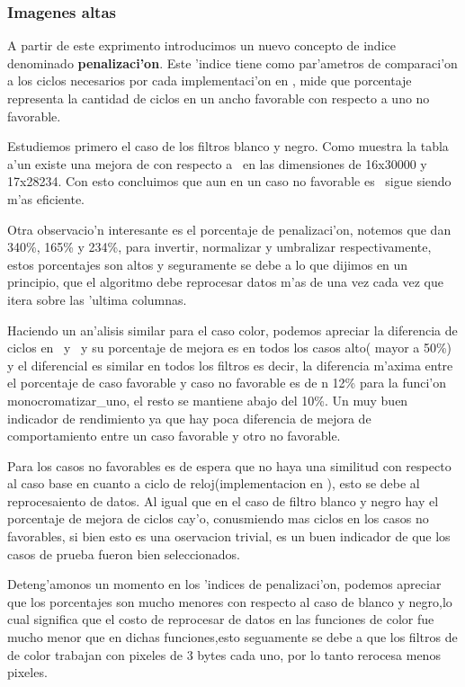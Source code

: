 \subsubsection{Imagenes altas}
A partir de este exprimento introducimos un nuevo concepto de indice denominado
\textbf{penalizaci'on}. Este 'indice tiene como par'ametros de comparaci'on a los ciclos necesarios por
cada implementaci'on en \ass, mide que porcentaje representa la cantidad de ciclos en un ancho 
favorable con respecto a uno no favorable.

Estudiemos primero el caso de los filtros blanco y negro. Como muestra la tabla a'un existe una 
mejora de \ass  con respecto a \C \  en las dimensiones de 16x30000 y 17x28234. Con esto concluimos que aun
en un caso no favorable es \ass \ sigue siendo m'as eficiente.

Otra observacio'n interesante es el porcentaje de penalizaci'on, notemos que dan 340\%, 165\% y
234\%, para invertir, normalizar y umbralizar respectivamente, estos porcentajes son altos 
y seguramente se debe a lo que dijimos en un principio, que el algoritmo debe reprocesar datos m'as de 
una vez cada vez que itera sobre las 'ultima columnas.

Haciendo un an'alisis similar para el caso color, 
podemos apreciar la diferencia de ciclos en \C \ y \ass \ y su porcentaje de mejora es en todos los casos
alto( mayor a 50\%) y el diferencial es similar en todos los filtros es decir,
la diferencia m'axima entre el porcentaje de caso favorable y caso no favorable es de n 12\% para la funci'on monocromatizar_uno,
el resto se mantiene abajo del 10\%. Un muy buen indicador de rendimiento ya que hay poca diferencia de mejora de
comportamiento entre un caso favorable y otro no favorable.

Para los casos no favorables es de espera que no haya una similitud con respecto al caso base en cuanto a ciclo de 
reloj(implementacion en \ass ), esto se debe al reprocesaiento de datos. Al igual que en el caso de filtro blanco y negro
hay el porcentaje de mejora de ciclos cay'o, conusmiendo mas ciclos en los casos no favorables, si bien esto es una 
oservacion trivial, es un buen indicador de que los casos de prueba fueron bien seleccionados.

Deteng'amonos un momento en los 'indices de penalizaci'on, podemos apreciar que los porcentajes son mucho 
menores con respecto al caso de blanco y negro,lo cual significa que el costo de reprocesar de datos en
las funciones de color fue mucho menor que en dichas funciones,esto seguamente se debe a que los filtros de de color
trabajan con pixeles de 3 bytes cada uno, por lo tanto rerocesa menos pixeles.

